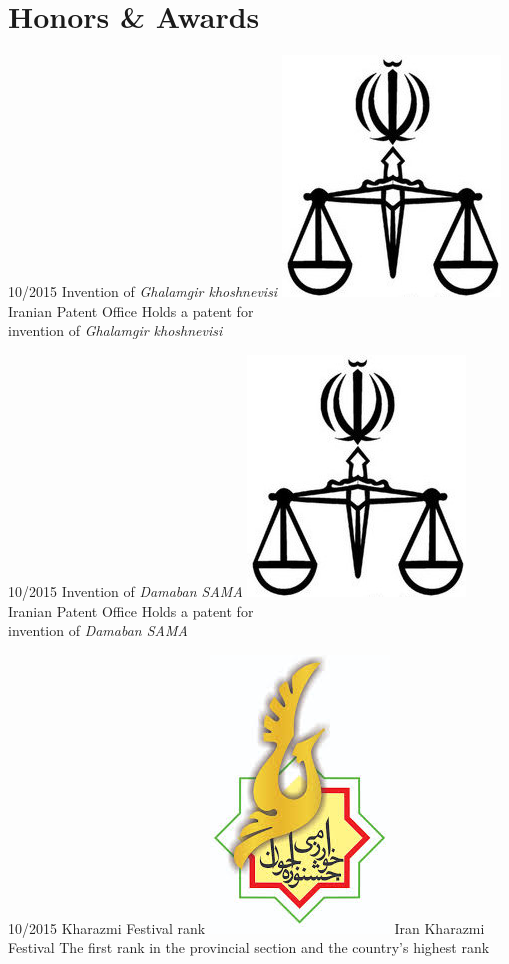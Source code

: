 \documentclass[a4paper]{friggeri-cv}
\begin{document}

\section{Honors \& Awards}
\begin{entrylist}

      \entry
    {10/2015}
    {   Invention of \emph{Ghalamgir khoshnevisi}}
    {\includegraphics[scale=0.06]{img/Ghovveh_logo.jpg} Iranian Patent Office}
    {Holds a patent for\\
    invention of \emph{Ghalamgir khoshnevisi}}

          \entry
    {10/2015}
    {   Invention of \emph{Damaban SAMA}}
    {\includegraphics[scale=0.06]{img/Ghovveh_logo.jpg} Iranian Patent Office}
    {Holds a patent for \\
    invention of \emph{Damaban SAMA}}

              \entry
    {10/2015}
    {   Kharazmi Festival rank}
    {\includegraphics[scale=0.06]{img/YKharazmi_logo.jpg} Iran Kharazmi Festival}
    {The first rank in the provincial section and the country's highest rank}

\end{entrylist}
\end{document}
